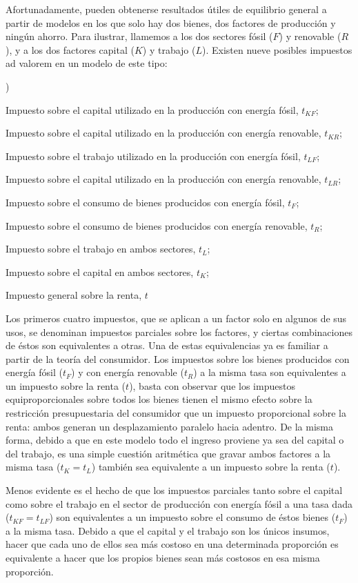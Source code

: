\documentclass[10pt,a4paper]{article}
\newcounter{alphaitem}
\newenvironment{la}
      {\begin{list}{\alph{alphaitem})}{%
          \usecounter{alphaitem}%
          \setlength{\leftmargin}{1cm}%
          \setlength{\parskip}{3pt}%
          \setlength{\itemsep}{0pt}%
          \setlength{\parsep}{0pt}%
      }}
      {\end{list}}
\begin{document}
Afortunadamente, pueden obtenerse resultados útiles de equilibrio general a partir de modelos en los que solo hay dos bienes, dos factores de producción y ningún ahorro. Para ilustrar, llamemos a los dos sectores fósil ($F$) y renovable ($R$), y a los dos factores capital ($K$) y trabajo ($L$). Existen nueve posibles impuestos ad valorem en un modelo de este tipo:
\begin{la}
    \item Impuesto sobre el capital utilizado en la producción con energía fósil, $t_{KF}$;
    \item Impuesto sobre el capital utilizado en la producción con energía renovable, $t_{KR}$;
    \item Impuesto sobre el trabajo utilizado en la producción con energía fósil, $t_{LF}$;
    \item Impuesto sobre el capital utilizado en la producción con energía renovable, $t_{LR}$;
    \item Impuesto sobre el consumo de bienes producidos con energía fósil, $t_F$;
    \item Impuesto sobre el consumo de bienes producidos con energía renovable, $t_R$;
    \item Impuesto sobre el trabajo en ambos sectores, $t_L$;
    \item Impuesto sobre el capital en ambos sectores, $t_K$;
    \item Impuesto general sobre la renta, $t$
\end{la}

Los primeros cuatro impuestos, que se aplican a un factor solo en algunos de sus usos, se denominan impuestos parciales sobre los factores, y ciertas combinaciones de éstos son equivalentes a otras. Una de estas equivalencias ya es familiar a partir de la teoría del consumidor. Los impuestos sobre los bienes producidos con energía fósil ($t_F$) y con energía renovable ($t_R$) a la misma tasa son equivalentes a un impuesto sobre la renta ($t$), basta con observar que los impuestos equiproporcionales sobre todos los bienes tienen el mismo efecto sobre la restricción presupuestaria del consumidor que un impuesto proporcional sobre la renta: ambos generan un desplazamiento paralelo hacia adentro. De la misma forma, debido a que en este modelo todo el ingreso proviene ya sea del capital o del trabajo, es una simple cuestión aritmética que gravar ambos factores a la misma tasa ($t_K= t_L$) también sea equivalente a un impuesto sobre la renta ($t$).

Menos evidente es el hecho de que los impuestos parciales tanto sobre el capital como sobre el trabajo en el sector de producción con energía fósil a una tasa dada ($t_{KF} = t_{LF}$) son equivalentes a un impuesto sobre el consumo de éstos bienes ($t_F$) a la misma tasa. Debido a que el capital y el trabajo son los únicos insumos, hacer que cada uno de ellos sea más costoso en una determinada proporción es equivalente a hacer que los propios bienes sean más costosos en esa misma proporción.
\end{document}
